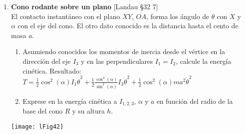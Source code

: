 \documentclass[11pt, spanish, a4paper, twoside]{article}
\begin{document}
\begin{enumerate}
	\item 
		\begin{minipage}[t][3.5cm]{0.55\textwidth}
			\textbf{Cono rodante sobre un plano} [Landau \S 32 7]\\
				 El contacto instantáneo con el plano \(X Y\), \(\overline{O A}\), forma los ángulo de \(\theta\) con \(X\) y \(\alpha\) con el eje del cono.
				 El otro dato conocido es la distancia hasta el cento de masa \(a\).
				\begin{enumerate}
					\item Asumiendo conocidos los momentos de inercia desde el vértice en la dirección del eje \(I_3\) y en las perpendiculares \(I_1 = I_2\), calcule la energía cinética. Resultado: \(T = \frac{1}{2} \cos^2(\alpha) I_1 \dot{\theta}^{2} + \frac{1}{2} \frac{\cos^4(\alpha)}{\sin^2(\alpha)} I_3  \dot{\theta}^{2} + \frac{1}{2} \cos^2(\alpha) m a^{2} \dot{\theta}^{2} \)
					\item Exprese en la energía cinética a \(I_{1,2,3}\), \(\alpha\) y \(a\) en función del radio de la base del cono \(R\) y su altura \(h\).
				\end{enumerate}
		\end{minipage}
		\begin{minipage}[c][0cm][t]{0.4\textwidth}
			\texttt{[image: lFig42]}
		\end{minipage}

\end{enumerate}
\end{document}
